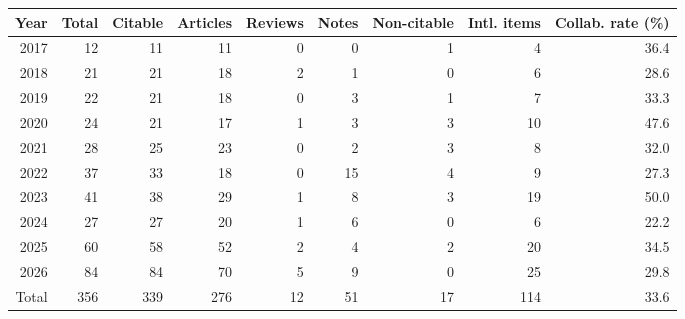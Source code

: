 \begin{tabular}{rrrrrrrrr}
\toprule
Year & Total & Citable & Articles & Reviews & Notes & Non-citable & Intl. items & Collab. rate (\%) \\
\midrule
2017 & 12 & 11 & 11 & 0 & 0 & 1 & 4 & 36.4 \\
2018 & 21 & 21 & 18 & 2 & 1 & 0 & 6 & 28.6 \\
2019 & 22 & 21 & 18 & 0 & 3 & 1 & 7 & 33.3 \\
2020 & 24 & 21 & 17 & 1 & 3 & 3 & 10 & 47.6 \\
2021 & 28 & 25 & 23 & 0 & 2 & 3 & 8 & 32.0 \\
2022 & 37 & 33 & 18 & 0 & 15 & 4 & 9 & 27.3 \\
2023 & 41 & 38 & 29 & 1 & 8 & 3 & 19 & 50.0 \\
2024 & 27 & 27 & 20 & 1 & 6 & 0 & 6 & 22.2 \\
2025 & 60 & 58 & 52 & 2 & 4 & 2 & 20 & 34.5 \\
2026 & 84 & 84 & 70 & 5 & 9 & 0 & 25 & 29.8 \\
\midrule
Total & 356 & 339 & 276 & 12 & 51 & 17 & 114 & 33.6 \\
\bottomrule
\end{tabular}
